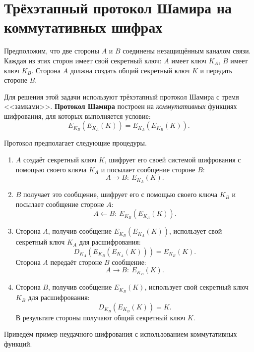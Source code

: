 \section[Трёхэтапный протокол Шамира]{Трёхэтапный протокол Шамира на коммутативных шифрах}

Предположим, что две стороны $A$ и $B$ соединены незащищённым каналом связи. Каждая из этих сторон имеет свой секретный ключ: $A$ имеет ключ $K_A$, $B$ имеет ключ $K_B$. Сторона $A$ должна создать общий секретный ключ $K$ и передать стороне $B$.

Для решения этой задачи используют трёхэтапный протокол Шамира с тремя <<замками>>. \textbf{Протокол Шамира} построен на \emph{коммутативных} функциях шифрования, для которых выполняется условие:
    \[ E_{K_{B}} (E_{K_{A}}(K))=E_{K_{A}} (E_{K_{B}}(K)). \]

Протокол предполагает следующие процедуры.
\begin{enumerate}
    \item $A$ создаёт секретный ключ $K$, шифрует его своей системой шифрования с помощью своего ключа $K_A$ и посылает сообщение стороне $B$:
        \[ A \rightarrow B: ~ E_{K_A}(K). \]
    \item $B$ получает это сообщение, шифрует его с помощью своего ключа $K_B$ и посылает сообщение стороне $A$:
        \[ A \leftarrow B: ~ E_{K_B}( E_{K_A}( K)). \]
    \item Сторона $A$, получив сообщение $E_{K_B}(E_{K_A}(K))$, использует свой секретный ключ $K_A$ для расшифрования:
            \[ D_{K_A}(E_{K_B} (E_{K_A}(K))) = E_{K_B}(K). \]
        Сторона $A$ передаёт стороне $B$ сообщение:
        \[ A \rightarrow B: ~ E_{K_B}(K). \]
    \item Сторона $B$, получив сообщение $E_{K_B}(K)$, использует свой секретный ключ $K_B$ для расшифрования:
            \[ D_{K_B}(E_{K_B}(K)) = K. \]
        В результате стороны получают общий секретный ключ $K$.
\end{enumerate}

Приведём пример неудачного шифрования с использованием коммутативных функций.


